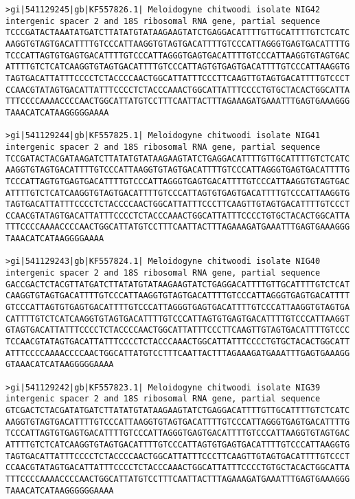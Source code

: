 \documentclass[11pt]{article}
\begin{document}
\begin{Verbatim}[commandchars=\\\{\}]
>gi|541129245|gb|KF557826.1| Meloidogyne chitwoodi isolate NIG42 intergenic spacer 2 and 18S ribosomal RNA gene, partial sequence
TCCCGATACTAAATATGATCTTATATGTATAAGAAGTATCTGAGGACATTTTGTTGCATTTTGTCTCATC
AAGGTGTAGTGACATTTTGTCCCATTAAGGTGTAGTGACATTTTGTCCCATTAGGGTGAGTGACATTTTG
TCCCATTAGTGTGAGTGACATTTTGTCCCATTAGGGTGAGTGACATTTTGTCCCATTAAGGTGTAGTGAC
ATTTTGTCTCATCAAGGTGTAGTGACATTTTGTCCCATTAGTGTGAGTGACATTTTGTCCCATTAAGGTG
TAGTGACATTATTTCCCCTCTACCCCAACTGGCATTATTTCCCTTCAAGTTGTAGTGACATTTTGTCCCT
CCAACGTATAGTGACATTATTTCCCCTCTACCCAAACTGGCATTATTTCCCCTGTGCTACACTGGCATTA
TTTCCCCAAAACCCCAACTGGCATTATGTCCTTTCAATTACTTTAGAAAGATGAAATTTGAGTGAAAGGG
TAAACATCATAAGGGGGAAAA

>gi|541129244|gb|KF557825.1| Meloidogyne chitwoodi isolate NIG41 intergenic spacer 2 and 18S ribosomal RNA gene, partial sequence
TCCGATACTACGATAAGATCTTATATGTATAAGAAGTATCTGAGGACATTTTGTTGCATTTTGTCTCATC
AAGGTGTAGTGACATTTTGTCCCATTAAGGTGTAGTGACATTTTGTCCCATTAGGGTGAGTGACATTTTG
TCCCATTAGTGTGAGTGACATTTTGTCCCATTAGGGTGAGTGACATTTTGTCCCATTAAGGTGTAGTGAC
ATTTTGTCTCATCAAGGTGTAGTGACATTTTGTCCCATTAGTGTGAGTGACATTTTGTCCCATTAAGGTG
TAGTGACATTATTTCCCCTCTACCCCAACTGGCATTATTTCCCTTCAAGTTGTAGTGACATTTTGTCCCT
CCAACGTATAGTGACATTATTTCCCCTCTACCCAAACTGGCATTATTTCCCCTGTGCTACACTGGCATTA
TTTCCCCAAAACCCCAACTGGCATTATGTCCTTTCAATTACTTTAGAAAGATGAAATTTGAGTGAAAGGG
TAAACATCATAAGGGGAAAA

>gi|541129243|gb|KF557824.1| Meloidogyne chitwoodi isolate NIG40 intergenic spacer 2 and 18S ribosomal RNA gene, partial sequence
GACCGACTCTACGTTATGATCTTATATGTATAAGAAGTATCTGAGGACATTTTGTTGCATTTTGTCTCAT
CAAGGTGTAGTGACATTTTGTCCCATTAAGGTGTAGTGACATTTTGTCCCATTAGGGTGAGTGACATTTT
GTCCCATTAGTGTGAGTGACATTTTGTCCCATTAGGGTGAGTGACATTTTGTCCCATTAAGGTGTAGTGA
CATTTTGTCTCATCAAGGTGTAGTGACATTTTGTCCCATTAGTGTGAGTGACATTTTGTCCCATTAAGGT
GTAGTGACATTATTTCCCCTCTACCCCAACTGGCATTATTTCCCTTCAAGTTGTAGTGACATTTTGTCCC
TCCAACGTATAGTGACATTATTTCCCCTCTACCCAAACTGGCATTATTTCCCCTGTGCTACACTGGCATT
ATTTCCCCAAAACCCCAACTGGCATTATGTCCTTTCAATTACTTTAGAAAGATGAAATTTGAGTGAAAGG
GTAAACATCATAAGGGGGAAAA

>gi|541129242|gb|KF557823.1| Meloidogyne chitwoodi isolate NIG39 intergenic spacer 2 and 18S ribosomal RNA gene, partial sequence
GTCGACTCTACGATATGATCTTATATGTATAAGAAGTATCTGAGGACATTTTGTTGCATTTTGTCTCATC
AAGGTGTAGTGACATTTTGTCCCATTAAGGTGTAGTGACATTTTGTCCCATTAGGGTGAGTGACATTTTG
TCCCATTAGTGTGAGTGACATTTTGTCCCATTAGGGTGAGTGACATTTTGTCCCATTAAGGTGTAGTGAC
ATTTTGTCTCATCAAGGTGTAGTGACATTTTGTCCCATTAGTGTGAGTGACATTTTGTCCCATTAAGGTG
TAGTGACATTATTTCCCCTCTACCCCAACTGGCATTATTTCCCTTCAAGTTGTAGTGACATTTTGTCCCT
CCAACGTATAGTGACATTATTTCCCCTCTACCCAAACTGGCATTATTTCCCCTGTGCTACACTGGCATTA
TTTCCCCAAAACCCCAACTGGCATTATGTCCTTTCAATTACTTTAGAAAGATGAAATTTGAGTGAAAGGG
TAAACATCATAAGGGGGGAAAA


\end{Verbatim}
\end{document}
